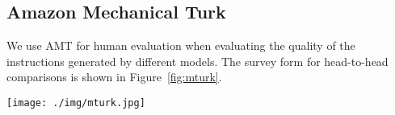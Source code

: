\documentclass[11pt,a4paper]{article}
\begin{document}
\subsection{Amazon Mechanical Turk}
We use AMT for human evaluation when evaluating the quality of the instructions generated by different models. The survey form for head-to-head comparisons is shown in Figure~\ref{fig:mturk}.

\begin{figure*}[t]
\centering
\texttt{[image: ./img/mturk.jpg]}
\caption{Pairwise comparison form for human evaluation on AMT.}
\label{fig:mturk}
\end{figure*}
\end{document}
